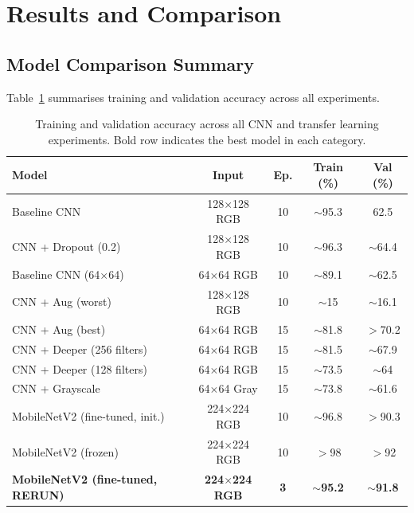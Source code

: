 \documentclass[a4paper,11pt]{article}
\begin{document}
\section{Results and Comparison}
\subsection{Model Comparison Summary}
Table~\ref{tab:results} summarises training and validation accuracy across all experiments.
 
\begin{table}[ht]
    \centering
    \begin{tabular}{|l|c|c|c|c|}
    \hline
    \textbf{Model} & \textbf{Input} & \textbf{Ep.}
      & \textbf{Train (\%)} & \textbf{Val (\%)} \\ \hline
    Baseline CNN                     & 128$\times$128 RGB  & 10 & $\sim$95.3 & 62.5 \\ \hline
    CNN + Dropout (0.2)              & 128$\times$128 RGB  & 10 & $\sim$96.3 & $\sim$64.4 \\ \hline
    Baseline CNN (64$\times$64)      & 64$\times$64 RGB    & 10 & $\sim$89.1 & $\sim$62.5 \\ \hline
    CNN + Aug (worst)                & 128$\times$128 RGB  & 10 & $\sim$15   & $\sim$16.1 \\ \hline
    CNN + Aug (best)                 & 64$\times$64 RGB    & 15 & $\sim$81.8 & $>$70.2 \\ \hline
    CNN + Deeper (256 filters)       & 64$\times$64 RGB    & 15 & $\sim$81.5 & $\sim$67.9 \\ \hline
    CNN + Deeper (128 filters)       & 64$\times$64 RGB    & 15 & $\sim$73.5 & $\sim$64 \\ \hline
    CNN + Grayscale                  & 64$\times$64 Gray   & 15 & $\sim$73.8 & $\sim$61.6 \\ \hline
    MobileNetV2 (fine-tuned, init.)  & 224$\times$224 RGB  & 10 & $\sim$96.8 & $>$90.3 \\ \hline
    MobileNetV2 (frozen)             & 224$\times$224 RGB  & 10 & $>$98      & $>$92 \\ \hline
    \textbf{MobileNetV2 (fine-tuned, RERUN)} & \textbf{224$\times$224 RGB} & \textbf{3} & \textbf{$\sim$95.2} & \textbf{$\sim$91.8} \\ \hline
    \end{tabular}
    \caption{Training and validation accuracy across all CNN and transfer learning experiments. Bold row indicates the best model in each category.}
    \label{tab:results}
\end{table}
\end{document}
